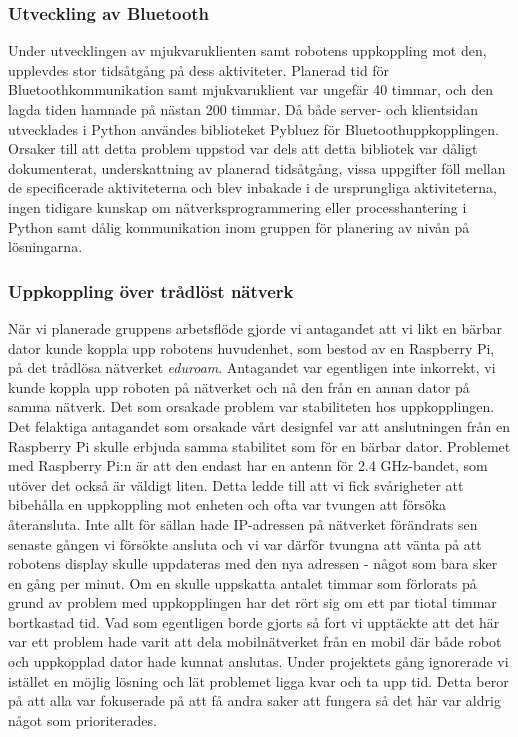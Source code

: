 \documentclass{article}
\begin{document}
\subsubsection{Utveckling av Bluetooth}
Under utvecklingen av mjukvaruklienten samt robotens uppkoppling mot den, upplevdes stor tidsåtgång på dess aktiviteter. Planerad tid för Bluetoothkommunikation samt mjukvaruklient var ungefär 40 timmar, och den lagda tiden hamnade på nästan 200 timmar. 
\newline\newline
Då både server- och klientsidan utvecklades i Python användes biblioteket Pybluez för Bluetoothuppkopplingen. Orsaker till att detta problem uppstod var dels att detta bibliotek var dåligt dokumenterat, underskattning av planerad tidsåtgång, vissa uppgifter föll mellan de specificerade aktiviteterna och blev inbakade i de ursprungliga aktiviteterna, ingen tidigare kunskap om nätverksprogrammering eller processhantering i Python samt dålig kommunikation inom gruppen för planering av nivån på lösningarna. 

\subsubsection{Uppkoppling över trådlöst nätverk}
När vi planerade gruppens arbetsflöde gjorde vi antagandet att vi likt en bärbar dator kunde koppla upp robotens huvudenhet, som bestod av en Raspberry Pi, på det trådlösa nätverket \textit{eduroam}. Antagandet var egentligen inte inkorrekt, vi kunde koppla upp roboten på nätverket och nå den från en annan dator på samma nätverk. Det som orsakade problem var stabiliteten hos uppkopplingen.
\newline\newline
Det felaktiga antagandet som orsakade vårt designfel var att anslutningen från en Raspberry Pi skulle erbjuda samma stabilitet som för en bärbar dator. Problemet med Raspberry Pi:n är att den endast har en antenn för 2.4 GHz-bandet, som utöver det också är väldigt liten. Detta ledde till att vi fick svårigheter att bibehålla en uppkoppling mot enheten och ofta var tvungen att försöka återansluta. Inte allt för sällan hade IP-adressen på nätverket förändrats sen senaste gången vi försökte ansluta och vi var därför tvungna att vänta på att robotens display skulle uppdateras med den nya adressen - något som bara sker en gång per minut.
\newline\newline
Om en skulle uppskatta antalet timmar som förlorats på grund av problem med uppkopplingen har det rört sig om ett par tiotal timmar bortkastad tid. Vad som egentligen borde gjorts så fort vi upptäckte att det här var ett problem hade varit att dela mobilnätverket från en mobil där både robot och uppkopplad dator hade kunnat anslutas. Under projektets gång ignorerade vi istället en möjlig lösning och lät problemet ligga kvar och ta upp tid. Detta beror på att alla var fokuserade på att få andra saker att fungera så det här var aldrig något som prioriterades.
\end{document}
